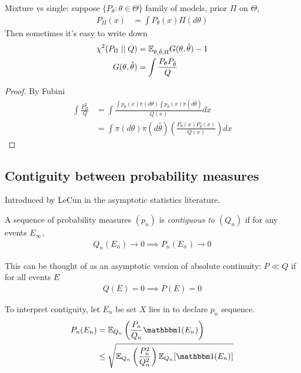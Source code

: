 Mixture vs single: suppose $\{P_\theta : \theta \in \Theta\}$ family of models,
prior $\Pi$ on $\Theta$,
\begin{align}
  P_\Pi(x) &= \int P_\theta(x) \Pi(d\theta)
\end{align}
Then sometimes it's easy to write down
\begin{align}
  \chi^2(P_\Pi \mid\mid Q) &= \mathbb{E}_{\theta, \hat\theta, \Pi} G(\theta, \hat\theta) - 1 \\
  G(\theta,\hat\theta) &= \int \frac{P_\theta P_{\tilde\theta}}{Q}
\end{align}

\begin{proof}
  By Fubini
  \begin{align}
    \int \frac{P_\Pi^2}{Q}
    &= \int \frac{\int p_\theta(x) \pi(d\theta) \int p_{\hat\theta}(x) \pi(d\hat\theta)}{Q(x)} dx \\
    &= \int \pi(d\theta) \pi(d\hat\theta) \left(\frac{P_\theta(x) P_{\hat\theta}(x)}{Q(x)}\right) dx
  \end{align}
\end{proof}

\subsection{Contiguity between probability measures}

Introduced by LeCun in the asymptotic statistics literature.

\begin{definition}
  A sequence of probability measures $(p_n)$ is \emph{contiguous to $(Q_n)$}
  if for any events $E_\infty$,
  \begin{align}
    Q_n(E_n) \to 0 \implies P_n(E_n) \to 0
  \end{align}
\end{definition}

This can be thought of as an asymptotic version of absolute continuity: $P \ll
Q$ if for all events $E$
\begin{align}
  Q(E) = 0 \implies P(E) = 0
\end{align}

To interpret contiguity, let $E_n$ be set $X$ lies in to declare $p_n$ sequence.
\begin{align}
  P_n(E_n)
  &= \ex_{Q_n}\left( \frac{P_n}{Q_n} \ind(E_n) \right) \\
  &\leq \sqrt{\ex_{Q_n}\left(\frac{P_n^2}{Q_n^2} \right) \ex_{Q_n}[\ind(E_n)]}
\end{align}

